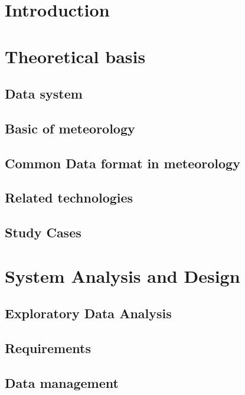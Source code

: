 \documentclass[12pt, a4paper]{report}
\begin{document}
\tableofcontents
\newpage

\listoffigures
\listoftables


\chapter{Introduction}


\newpage

\chapter{Theoretical basis}
\section{Data system}

\section{Basic of meteorology}

\section{Common Data format in meteorology}

\section{Related technologies}

\section{Study Cases}


\newpage
\chapter{System Analysis and Design}
\section{Exploratory Data Analysis}

\section{Requirements}

\section{Data management}

\end{document}
